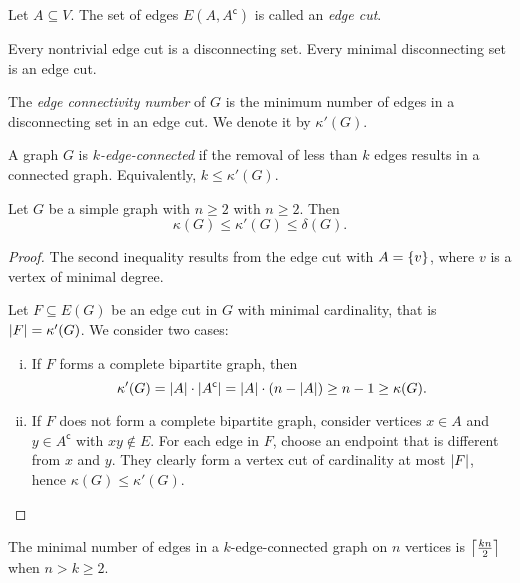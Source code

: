\begin{definicija}
Let $A \subseteq V$. The set of edges
$E(A, A^{\mathsf{c}})$ is called an
\emph{edge cut}.
\end{definicija}

\begin{opomba}
Every nontrivial edge cut is a disconnecting set. Every minimal
disconnecting set is an edge cut.
\end{opomba}

\begin{definicija}
The \emph{edge connectivity number}
of $G$ is the minimum number of edges in a disconnecting set in an
edge cut. We denote it by $\kappa'(G)$.
\end{definicija}

\begin{definicija}
A graph $G$ is \emph{$k$-edge-connected}
if the removal of less than $k$ edges results in a connected graph.
Equivalently, $k \leq \kappa'(G)$.
\end{definicija}

\begin{izrek}
Let $G$ be a simple graph with $n \geq 2$ with $n \geq 2$. Then
\[
\kappa(G) \leq \kappa'(G) \leq \delta(G).
\]
\end{izrek}

\begin{proof}
The second inequality results from the edge cut with $A = \left\{v\right\}$,
where $v$ is a vertex of minimal degree.

Let $F \subseteq E(G)$ be an edge cut in $G$ with minimal
cardinality, that is $\left\lvert F\right\rvert = \kappa'(G)$. We consider two cases:

\begin{enumerate}[i)]
\item If $F$ forms a complete bipartite graph, then
\[
\kappa'(G) =
\left\lvert A\right\rvert \cdot \left\lvert A^{\mathsf{c}}\right\rvert =
\left\lvert A\right\rvert \cdot \left(n - \left\lvert A\right\rvert\right) \geq
n-1 \geq
\kappa(G).
\]
\item If $F$ does not form a complete bipartite graph, consider
vertices $x \in A$ and $y \in A^{\mathsf{c}}$ with $xy \not \in E$.
For each edge in $F$, choose an endpoint that is different from $x$
and $y$. They clearly form a vertex cut of cardinality at most
$\left\lvert F\right\rvert$, hence $\kappa(G) \leq \kappa'(G)$. \qedhere
\end{enumerate}
\end{proof}

\begin{posledica}
The minimal number of edges in a $k$-edge-connected graph on $n$
vertices is $\left\lceil \frac{kn}{2}\right\rceil$ when $n > k \geq 2$.
\end{posledica}

